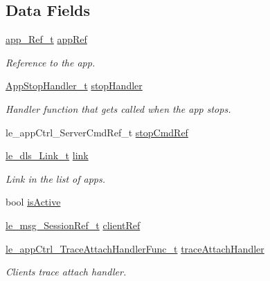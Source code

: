 \subsection*{Data Fields}
\begin{DoxyCompactItemize}
\item 
\hyperlink{daemons_2linux_2supervisor_2app_8h_abe19231bb456bb0f61b343fd1d85ba42}{app\+\_\+\+Ref\+\_\+t} \hyperlink{struct_app_container__t_a08ad8f9a2564111f9acac2038de0197d}{app\+Ref}
\begin{DoxyCompactList}\small\item\em Reference to the app. \end{DoxyCompactList}\item 
\hyperlink{apps_8c_af0ebf52286e44ef2ae18f2fa4f151e7b}{App\+Stop\+Handler\+\_\+t} \hyperlink{struct_app_container__t_a579a3e19c2fb22e5b54c724b72be40b1}{stop\+Handler}
\begin{DoxyCompactList}\small\item\em Handler function that gets called when the app stops. \end{DoxyCompactList}\item 
le\+\_\+app\+Ctrl\+\_\+\+Server\+Cmd\+Ref\+\_\+t \hyperlink{struct_app_container__t_ac8f1ef4d812f5eafc6c274cbef3c5e4d}{stop\+Cmd\+Ref}
\item 
\hyperlink{structle__dls___link__t}{le\+\_\+dls\+\_\+\+Link\+\_\+t} \hyperlink{struct_app_container__t_a1129ed203092af7855ec052e86c7107f}{link}
\begin{DoxyCompactList}\small\item\em Link in the list of apps. \end{DoxyCompactList}\item 
bool \hyperlink{struct_app_container__t_aae9312f13cc0f0ecfa514557a037a3a1}{is\+Active}
\item 
\hyperlink{le__messaging_8h_aebfc01e15b430a5b4f3038a5bd518904}{le\+\_\+msg\+\_\+\+Session\+Ref\+\_\+t} \hyperlink{struct_app_container__t_a95c59bd17484cf177ede849eb5586937}{client\+Ref}
\item 
\hyperlink{le__app_ctrl__interface_8h_a71556a4ce496caa172e138e65eee656c}{le\+\_\+app\+Ctrl\+\_\+\+Trace\+Attach\+Handler\+Func\+\_\+t} \hyperlink{struct_app_container__t_aac07518a319eb3394c8a9164d2f7a025}{trace\+Attach\+Handler}
\begin{DoxyCompactList}\small\item\em Client\textquotesingle{}s trace attach handler. \end{DoxyCompactList}\item 

\end{DoxyCompactItemize}
